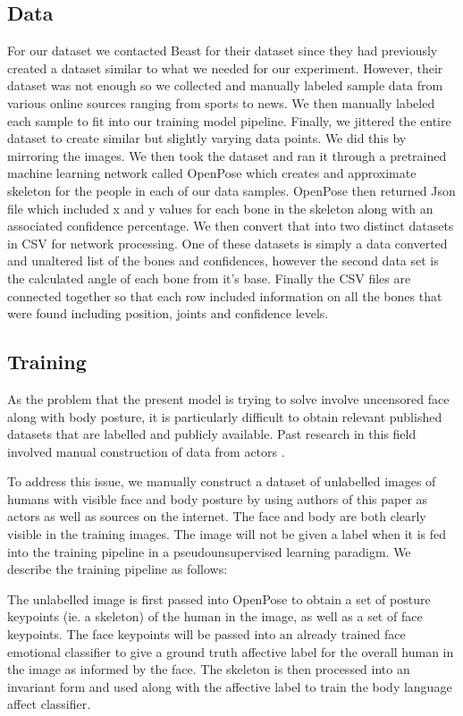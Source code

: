 \documentclass{article}
\begin{document}
\subsection{Data}
For our dataset we contacted Beast for their dataset since they had previously created a dataset similar to what we needed for our experiment.  However, their dataset was not enough so we collected and manually labeled sample data from various online sources ranging from sports to news. We then manually labeled each sample to fit into our training model pipeline. Finally, we jittered the entire dataset to create similar but slightly varying data points. We did this by mirroring the images. We then took the dataset and ran it through a pretrained machine learning network called OpenPose which creates and approximate skeleton for the people in each of our data samples. OpenPose then returned Json file which included x and y values for each bone in the skeleton along with an associated confidence percentage. We then convert that into two distinct datasets in CSV for network processing. One of these datasets is simply a data converted and unaltered list of the bones and confidences, however the second data set is the calculated angle of each bone from it’s base. Finally the CSV files are connected together so that each row included information on all the bones that were found including position, joints and confidence levels.

\subsection{Training}
As the problem that the present model is trying to solve involve uncensored face along with body posture, it is particularly difficult to obtain relevant published datasets that are labelled and publicly available. Past research in this field involved manual construction of data from actors \citep{schindler2008recognizing}.

To address this issue, we manually construct a dataset of unlabelled images of humans with visible face and body posture by using authors of this paper as actors as well as sources on the internet. The face and body are both clearly visible in the training images. The image will not be given a label when it is fed into the training pipeline in a pseudounsupervised learning paradigm. We describe the training pipeline as follows:


The unlabelled image is first passed into OpenPose to obtain a set of posture keypoints (ie. a skeleton) of the human in the image, as well as a set of face keypoints. The face keypoints will be passed into an already trained face emotional classifier to give a ground truth affective label for the overall human in the image as informed by the face. The skeleton is then processed into an invariant form and used along with the affective label to train the body language affect classifier.
\end{document}
